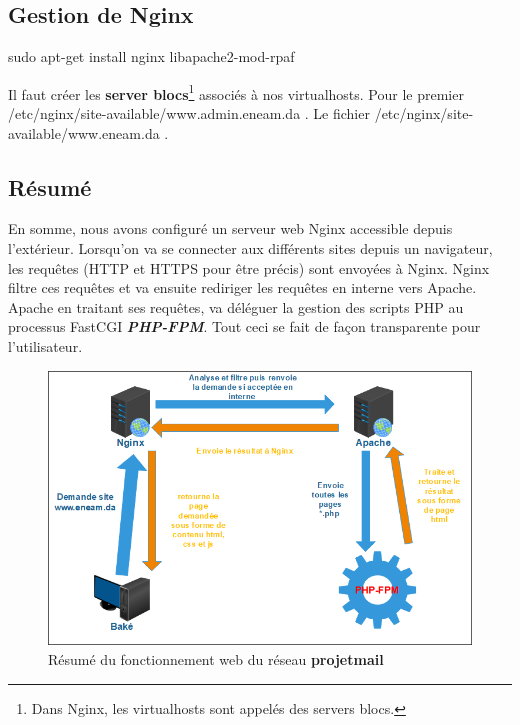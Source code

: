 \documentclass[a4paper,12pt,french]{report} %
\begin{document}
\subsection{Gestion de Nginx}
\begin{exempleConsole}
sudo apt-get install nginx libapache2-mod-rpaf
\end{exempleConsole}

Il faut créer les  \textbf{server blocs}\footnote{Dans Nginx, les virtualhosts sont appelés des servers blocs.} associés à nos virtualhosts. Pour le premier /etc/nginx/site-available/www.admin.eneam.da .
Le fichier /etc/nginx/site-available/www.eneam.da .
\subsection*{Résumé}
En somme, nous avons configuré un serveur web Nginx accessible depuis l'extérieur. Lorsqu'on va se connecter aux différents sites depuis un navigateur, les requêtes (HTTP et HTTPS pour être précis) sont envoyées à Nginx. Nginx filtre  ces requêtes et va ensuite rediriger les requêtes en interne vers Apache. Apache en traitant ses requêtes, va déléguer la gestion des scripts PHP au processus FastCGI \emph{\textbf{PHP-FPM}}. Tout ceci se fait de façon transparente pour l'utilisateur.
\begin{figure}[H]
	\centering
	\includegraphics[scale=0.7]{figure/resume-fonctionnement-web-eneam.png}
	\caption{Résumé du fonctionnement web du réseau \textbf{projetmail}}
\end{figure}
\end{document}
